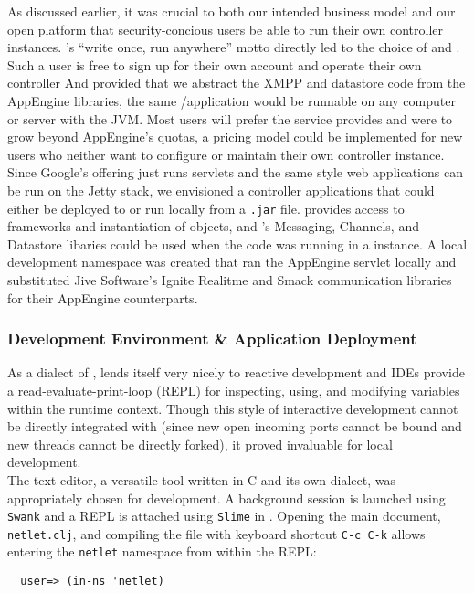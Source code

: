 As discussed earlier, it was crucial to both our intended business model and our open platform that security-concious users be able to run their own \netlets controller instances.  \java's ``write once, run anywhere'' motto directly led to the choice of \clojure and \gae.  Such a user is free to sign up for their own \aengn account and operate their own \netlets controller  And provided that we abstract the XMPP and datastore code from the AppEngine libraries, the same \clojure/\java application would be runnable on any computer or server with the JVM.  Most users will prefer the service \google provides and were \netlets to grow beyond AppEngine's quotas, a pricing model could be implemented for new users who neither want to configure or maintain their own controller instance.\\

Since Google's offering just runs \java servlets and the same style web applications can be run on the Jetty stack, we envisioned a \java controller applications that could either be deployed to \aengn or run locally from a \texttt{.jar} file.  \clojure provides access to \java frameworks and instantiation of \java objects, and \google's Messaging, Channels, and Datastore libaries could be used when the code was running in a \gae instance.  A local development \clojure namespace was created that ran the AppEngine servlet locally and substituted Jive Software's Ignite Realitme and Smack communication libraries for their AppEngine counterparts.\\

\subsubsection{Development Environment \& Application Deployment}
As a dialect of \lisp, \clojure lends itself very nicely to reactive development and \clojure IDEs provide a read-evaluate-print-loop (REPL) for inspecting, using, and modifying variables within the runtime context.  Though this style of interactive development cannot be directly integrated with \gae (since new open incoming ports cannot be bound and new threads cannot be directly forked), it proved invaluable for local development.\\

The \emacs text editor, a versatile tool written in C and its own \lisp dialect, was appropriately chosen for \clojure development.  A background \clojure session is launched using \texttt{Swank} and a REPL is attached using \texttt{Slime} in \emacs.  Opening the main \netlets \clojure document, \texttt{netlet.clj}, and compiling the file with keyboard shortcut \texttt{C-c C-k} allows entering the \texttt{netlet} namespace from within the REPL:
\begin{lstlisting}
  user=> (in-ns 'netlet)
\end{lstlisting}


